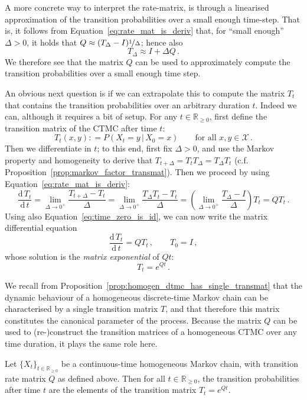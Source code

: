 \documentclass[graybox]{svmult}
\newcommand{\reals}{\mathbb{R}}
\newcommand{\realsnonneg}{\reals_{\geq 0}}
\newcommand{\states}{\mathcal{X}}
\newcommand{\coloneqq}{:\!=}
\begin{document}
A more concrete way to interpret the rate-matrix, is through a linearised approximation of the transition probabilities over a small enough time-step. That is, it follows from Equation~\eqref{eq:rate_mat_is_deriv} that, for ``small enough'' $\Delta>0$, it holds that $Q\approx (T_\Delta-I)\nicefrac{1}{\Delta}$; hence also
\begin{equation}\label{eq:cont_trans_small_delta}
T_\Delta \approx I + \Delta Q\,.
\end{equation}
We therefore see that the matrix $Q$ can be used to approximately compute the transition probabilities over a small enough time step.

An obvious next question is if we can extrapolate this to compute the matrix $T_t$ that contains the transition probabilities over an arbitrary duration $t$. Indeed we can, although it requires a bit of setup. For any $t\in\realsnonneg$, first define the transition matrix of the CTMC after time $t$:
\begin{equation*}
T_t(x,y) \coloneqq P(X_{t}=y\,\vert\,X_0=x)\quad\quad\text{for all }x,y\in\states\,.
\end{equation*}
Then we differentiate in $t$; to this end, first fix $\Delta>0$, and use the Markov property and homogeneity to derive that $T_{t+\Delta} = T_tT_\Delta=T_\Delta T_t$ (c.f. Proposition~\ref{prop:markov_factor_transmat}). Then we proceed by using Equation~\eqref{eq:rate_mat_is_deriv}:
\begin{equation*}
\frac{\mathrm{d}\,T_t}{\mathrm{d}\,t} = \lim_{\Delta\to0^+} \frac{T_{t+\Delta} - T_t}{\Delta} = \lim_{\Delta\to0^+} \frac{T_\Delta T_t - T_t}{\Delta} = \left(\lim_{\Delta\to0^+} \frac{T_\Delta - I}{\Delta}\right)T_t = QT_t\,.
\end{equation*}
Using also Equation~\eqref{eq:time_zero_is_id}, we can now write the matrix differential equation
\begin{equation*}
\frac{\mathrm{d}\,T_t}{\mathrm{d}\,t} = QT_t\,,\quad\quad T_0 = I\,,
\end{equation*}
whose solution is the \emph{matrix exponential} of $Qt$:
\begin{equation*}
T_t = e^{Qt}\,.
\end{equation*}

We recall from Proposition~\ref{prop:homogen_dtmc_has_single_transmat} that the dynamic behaviour of a homogeneous discrete-time Markov chain can be characterised by a single transition matrix $T$, and that therefore this matrix constitutes the canonical parameter of the process. Because the matrix $Q$ can be used to (re-)construct the transition matrices of a homogeneous CTMC over any time duration, it plays the same role here.
\begin{proposition}\label{prop:ctmc_homogen_transmat_is_exponential}
Let $\{X_t\}_{t\in\realsnonneg}$ be a continuous-time homogeneous Markov chain, with transition rate matrix $Q$ as defined above. Then for all $t\in\realsnonneg$, the transition probabilities after time $t$ are the elements of the transition matrix $T_t=e^{Qt}$.
\end{proposition}
\end{document}
